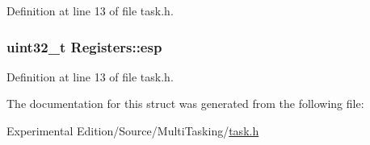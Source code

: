 Definition at line 13 of file task.\+h.

\subsubsection[{\texorpdfstring{esp}{esp}}]{\setlength{\rightskip}{0pt plus 5cm}uint32\+\_\+t Registers\+::esp}\hypertarget{structRegisters_aca352215ac1e37f833da4f6289392261}{}\label{structRegisters_aca352215ac1e37f833da4f6289392261}


Definition at line 13 of file task.\+h.



The documentation for this struct was generated from the following file\+:\begin{DoxyCompactItemize}
\item 
Experimental Edition/\+Source/\+Multi\+Tasking/\hyperlink{task_8h}{task.\+h}\end{DoxyCompactItemize}
